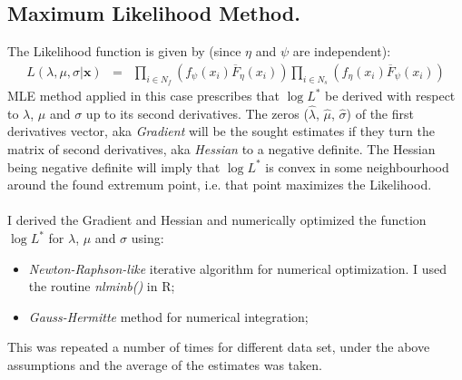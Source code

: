\documentclass{article}
\begin{document}
\subsection{Maximum Likelihood Method.}
\indent \indent The Likelihood function is given by (since $\eta$ and $\psi$ are independent):
\begin{eqnarray}
L(\lambda, \mu, \sigma | \textbf{x}) &=& \prod_{i \in N_f} \left( f_\psi \left( x_i \right) \overline F_\eta \left( x_i \right) \right)\prod_{i \in N_s} \left( f_\eta \left( x_i \right) \overline F_\psi \left( x_i \right) \right)
\end{eqnarray}
MLE method applied in this case prescribes that $\log L^*$ be derived with respect to $\lambda$, $\mu$ and $\sigma$ up to its second derivatives. The zeros ($\hat{\lambda}$, $\hat{\mu}$, $\hat{\sigma}$) of the first derivatives vector, aka \textit{Gradient} will be the sought estimates if they turn the matrix of second derivatives, aka \textit{Hessian} to a negative definite. The Hessian being negative definite will imply that $\log L^*$ is convex in some neighbourhood around the found extremum point, i.e. that point maximizes the Likelihood.\\ 
\\I derived the Gradient and Hessian and numerically optimized the function $\log L^*$ for $\lambda$, $\mu$ and $\sigma$ using:
\begin{itemize}
\item \textit{Newton-Raphson-like} iterative algorithm for numerical optimization. I used the routine \textit{nlminb()} in R;
\item \textit{Gauss-Hermitte} method for numerical integration;
\end{itemize}
This was repeated a number of times for different data set, under the above assumptions and the average of the estimates was taken.
\end{document}
